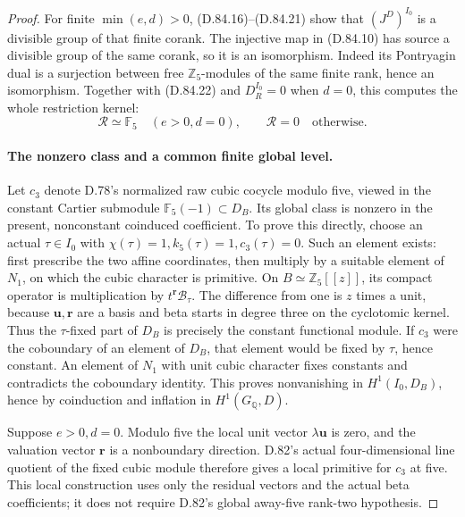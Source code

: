 \begin{proof}
For finite \(\min(e,d)>0\), (D.84.16)--(D.84.21) show
that \((J^D)^{I_0}\) is a divisible group of that finite
corank. The injective map in (D.84.10) has source a
divisible group of the same corank, so it is an isomorphism.
Indeed its Pontryagin dual is a surjection between free
\(\mathbb Z_5\)-modules of the same finite rank, hence an
isomorphism. Together with (D.84.22) and
\(D_R^{I_0}=0\) when \(d=0\), this computes the whole
restriction kernel:
\[
 \mathcal R\simeq\mathbb F_5\quad(e>0,d=0),
 \qquad \mathcal R=0\quad\text{otherwise}.
                                                                  \tag{D.84.24}
\]

\paragraph{The nonzero class and a common finite global level.}
Let \(c_3\) denote D.78's normalized raw cubic cocycle
modulo five, viewed in the constant Cartier submodule
\(\mathbb F_5(-1)\subset D_B\).
Its global class is nonzero in the present, nonconstant
coinduced coefficient. To prove this directly, choose
an actual \(\tau\in I_0\) with
\(\chi(\tau)=1,k_5(\tau)=1,c_3(\tau)=0\).
Such an element exists: first prescribe the two affine
coordinates, then multiply by a suitable element of
\(N_1\), on which the cubic character is primitive.
On \(B\simeq\mathbb Z_5[[z]]\), its compact operator is
multiplication by \(t^{\mathbf r}\mathcal B_\tau\).
The difference from one is \(z\) times a unit, because
\(\mathbf u,\mathbf r\) are a basis and beta starts in
degree three on the cyclotomic kernel.
Thus the \(\tau\)-fixed part of \(D_B\) is precisely the
constant functional module. If \(c_3\) were the coboundary
of an element of \(D_B\), that element would be fixed
by \(\tau\), hence constant. An element of \(N_1\) with
unit cubic character fixes constants and contradicts
the coboundary identity. This proves nonvanishing in
\(H^1(I_0,D_B)\), hence by coinduction and inflation in
\(H^1(G_{\mathbb Q},D)\).

Suppose \(e>0,d=0\). Modulo five the local unit vector
\(\lambda\mathbf u\) is zero, and the valuation vector
\(\mathbf r\) is a nonboundary direction. D.82's actual
four-dimensional line quotient of the fixed cubic module
therefore gives a local primitive for \(c_3\) at five.
This local construction uses only the residual vectors
and the actual beta coefficients; it does not require
D.82's global away-five rank-two hypothesis.


\end{proof}
